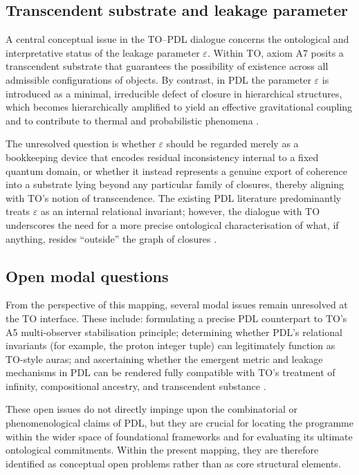 \documentclass{article}
\begin{document}
\subsection{Transcendent substrate and leakage parameter}
\label{subsec:transcendent_leakage}

A central conceptual issue in the TO–PDL dialogue concerns the ontological and interpretative status of the leakage parameter \(\varepsilon\). Within TO, axiom A7 posits a transcendent substrate that guarantees the possibility of existence across all admissible configurations of objects. By contrast, in PDL the parameter \(\varepsilon\) is introduced as a minimal, irreducible defect of closure in hierarchical structures, which becomes hierarchically amplified to yield an effective gravitational coupling and to contribute to thermal and probabilistic phenomena \cite{Exponent_18_PDL_2026,Coherence_Leakage_18_2026}.

The unresolved question is whether \(\varepsilon\) should be regarded merely as a bookkeeping device that encodes residual inconsistency internal to a fixed quantum domain, or whether it instead represents a genuine export of coherence into a substrate lying beyond any particular family of closures, thereby aligning with TO’s notion of transcendence. The existing PDL literature predominantly treats \(\varepsilon\) as an internal relational invariant; however, the dialogue with TO underscores the need for a more precise ontological characterisation of what, if anything, resides “outside” the graph of closures \cite{PDL_TO_dialogue,PDL_position}.

\subsection{Open modal questions}
\label{subsec:modal_open}

From the perspective of this mapping, several modal issues remain unresolved at the TO interface. These include: formulating a precise PDL counterpart to TO’s A5 multi-observer stabilisation principle; determining whether PDL’s relational invariants (for example, the proton integer tuple) can legitimately function as TO-style auras; and ascertaining whether the emergent metric and leakage mechanisms in PDL can be rendered fully compatible with TO’s treatment of infinity, compositional ancestry, and transcendent substance
\cite{PDL_TO_dialogue,PDL_position}.

These open issues do not directly impinge upon the combinatorial or phenomenological claims of PDL, but they are crucial for locating the programme within the wider space of foundational frameworks and for evaluating its ultimate ontological commitments. Within the present mapping, they are therefore identified as conceptual open problems rather than as core structural elements.
\end{document}
